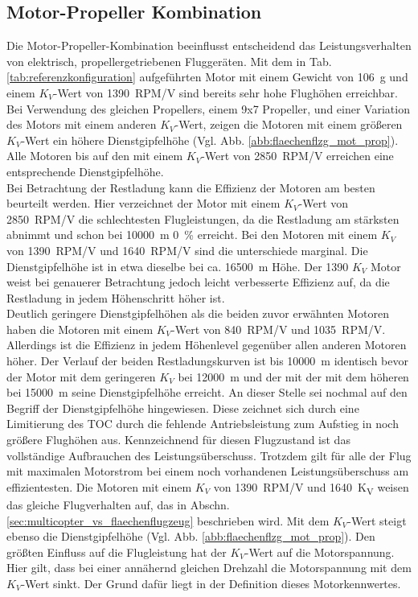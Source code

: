 \subsection{Motor-Propeller Kombination}
\label{subsec:mot_prop_kombi}
Die Motor-Propeller-Kombination beeinflusst entscheidend das Leistungsverhalten von elektrisch, propellergetriebenen Fluggeräten. Mit dem in Tab. \ref{tab:referenzkonfiguration} aufgeführten Motor mit einem Gewicht von \SI{106}{g} und einem \ensuremath{K_V}-Wert von \SI{1390}{RPM/V} sind bereits sehr hohe Flughöhen erreichbar. Bei Verwendung des gleichen Propellers, einem 9x7 Propeller, und einer Variation des Motors mit einem anderen \ensuremath{K_V}-Wert, zeigen die Motoren mit einem größeren \ensuremath{K_V}-Wert ein höhere Dienstgipfelhöhe (Vgl. Abb. \ref{abb:flaechenflzg_mot_prop}). Alle Motoren bis auf den mit einem \ensuremath{K_V}-Wert von \SI{2850}{RPM/V} erreichen eine entsprechende Dienstgipfelhöhe.\\
Bei Betrachtung der Restladung kann die Effizienz der Motoren am besten beurteilt werden. Hier verzeichnet der Motor mit einem \ensuremath{K_V}-Wert von \SI{2850}{RPM/V} die schlechtesten Flugleistungen, da die Restladung am stärksten abnimmt und schon bei \SI{10000}{m} \SI{0}{\%} erreicht. Bei den Motoren mit einem \ensuremath{K_V} von \SI{1390}{RPM/V} und \SI{1640}{RPM/V} sind die unterschiede marginal. Die Dienstgipfelhöhe ist in etwa dieselbe bei ca. \SI{16500}{m} Höhe. Der \SI{1390}{} \ensuremath{K_V} Motor weist bei genauerer Betrachtung jedoch leicht verbesserte Effizienz auf, da die Restladung in jedem Höhenschritt höher ist. \\
Deutlich geringere Dienstgipfelhöhen als die beiden zuvor erwähnten Motoren haben die Motoren mit einem \ensuremath{K_V}-Wert von \SI{840}{RPM/V} und \SI{1035}{RPM/V}. Allerdings ist die Effizienz in jedem Höhenlevel gegenüber allen anderen Motoren höher. Der Verlauf der beiden Restladungskurven ist bis \SI{10000}{m} identisch bevor der Motor mit dem geringeren \ensuremath{K_V} bei \SI{12000}{m} und der mit der mit dem höheren bei \SI{15000}{m} seine Dienstgipfelhöhe erreicht. 
An dieser Stelle sei nochmal auf den Begriff der Dienstgipfelhöhe hingewiesen. Diese zeichnet sich durch eine Limitierung des TOC durch die fehlende Antriebsleistung zum Aufstieg in noch größere Flughöhen aus. Kennzeichnend für diesen Flugzustand ist das vollständige Aufbrauchen des Leistungsüberschuss. Trotzdem gilt für alle der Flug mit maximalen Motorstrom bei einem noch vorhandenen Leistungsüberschuss am effizientesten.
Die Motoren mit einem \ensuremath{K_V} von \SI{1390}{RPM/V} und \SI{1640}{K_V} weisen das gleiche Flugverhalten auf, das in Abschn. \ref{sec:multicopter_vs_flaechenflugzeug} beschrieben wird.
Mit dem \ensuremath{K_V}-Wert steigt ebenso die Dienstgipfelhöhe (Vgl. Abb. \ref{abb:flaechenflzg_mot_prop}). Den größten Einfluss auf die Flugleistung hat der \ensuremath{K_V}-Wert auf die Motorspannung. Hier gilt, dass bei einer annähernd gleichen Drehzahl die Motorspannung mit dem \ensuremath{K_V}-Wert sinkt. Der Grund dafür liegt in der Definition dieses Motorkennwertes.\\

